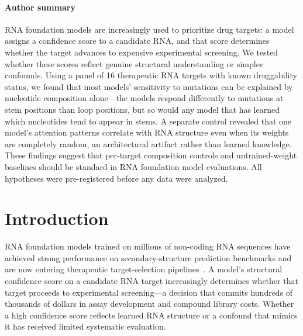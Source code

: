 \documentclass[11pt]{article}
\begin{document}
\paragraph*{Author summary}
RNA foundation models are increasingly used to prioritize drug targets:
a model assigns a confidence score to a candidate RNA, and that score
determines whether the target advances to expensive experimental
screening.  We tested whether these scores reflect genuine structural
understanding or simpler confounds.  Using a panel of 16 therapeutic RNA
targets with known druggability status, we found that most models'
sensitivity to mutations can be explained by nucleotide composition
alone---the models respond differently to mutations at stem positions
than loop positions, but so would any model that has learned which
nucleotides tend to appear in stems.  A separate control revealed that
one model's attention patterns correlate with RNA structure even when its
weights are completely random, an architectural artifact rather than
learned knowledge.  These findings suggest that per-target composition
controls and untrained-weight baselines should be standard in RNA
foundation model evaluations.  All hypotheses were pre-registered before
any data were analyzed.


\section{Introduction}

RNA foundation models trained on millions of non-coding RNA sequences have
achieved strong performance on secondary-structure prediction benchmarks and
are now entering therapeutic target-selection pipelines~\citep{rnafm2022,
rinalmo2024, ernierna2024, atomicai2025, alnylam2026}. A model's structural
confidence score on a candidate RNA target increasingly determines whether
that target proceeds to experimental screening---a decision that commits
hundreds of thousands of dollars in assay development and compound library
costs. Whether a high confidence score reflects learned RNA structure or a
confound that mimics it has received limited systematic evaluation.
\end{document}
